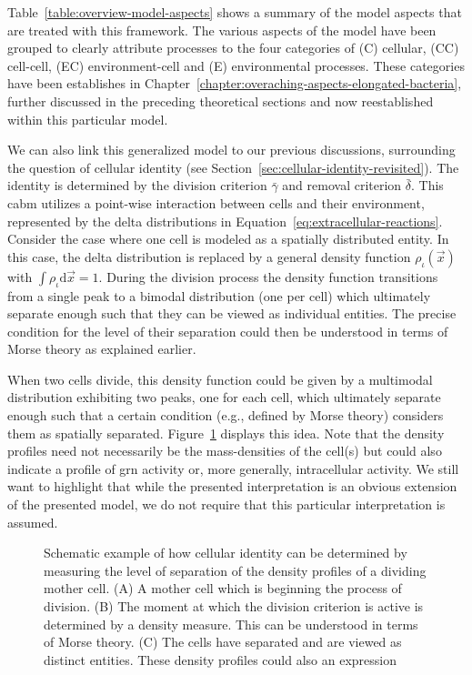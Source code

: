 Table~\ref{table:overview-model-aspects} shows a summary of the model aspects that are treated with
this framework.
The various aspects of the model have been grouped to clearly attribute processes to the four
categories of (C) cellular, (CC) cell-cell, (EC) environment-cell and (E) environmental processes.
These categories have been establishes in
Chapter~\ref{chapter:overaching-aspects-elongated-bacteria}, further discussed in the preceding
theoretical sections and now reestablished within this particular model.

We can also link this generalized model to our previous discussions, surrounding the question of
cellular identity (see Section~\ref{sec:cellular-identity-revisited}).
The identity is determined by the division criterion $\bar{\gamma}$ and removal criterion
$\bar{\delta}$.
This \ac{cabm} utilizes a point-wise interaction between cells and their environment, represented by
the delta distributions in Equation~\ref{eq:extracellular-reactions}.
Consider the case where one cell is modeled as a spatially distributed entity.
In this case, the delta distribution is replaced by a general density function $\rho_\iota(\vec{x})$
with $\int\rho_\iota\text{d}\vec{x}=1$.
During the division process the density function transitions from a single peak to a bimodal
distribution (one per cell) which ultimately separate enough such that they can be viewed as
individual entities.
The precise condition for the level of their separation could then be understood in terms of Morse
theory as explained earlier.

When two cells divide, this density function could be given by a multimodal distribution exhibiting
two peaks, one for each cell, which ultimately separate enough such that a certain condition (e.g.,
defined by Morse theory) considers them as spatially separated.
Figure~\ref{fig:separation-of-distributions} displays this idea.
Note that the density profiles need not necessarily be the mass-densities of the cell(s) but could
also indicate a profile of \ac{grn} activity or, more generally, intracellular activity.
We still want to highlight that while the presented interpretation is an obvious extension of the
presented model, we do not require that this particular interpretation is assumed.

\begin{figure}
    \centering
    
    \caption[Spatial separation of dividing Cells]{
        Schematic example of how cellular identity can be determined by measuring the level of
        separation of the density profiles of a dividing mother cell.
        (A) A mother cell which is beginning the process of division.
        (B) The moment at which the division criterion is active is determined by a density measure.
        This can be understood in terms of Morse theory.
        (C) The cells have separated and are viewed as distinct entities.
        These density profiles could also an expression 
    }
    \label{fig:separation-of-distributions}
\end{figure}

